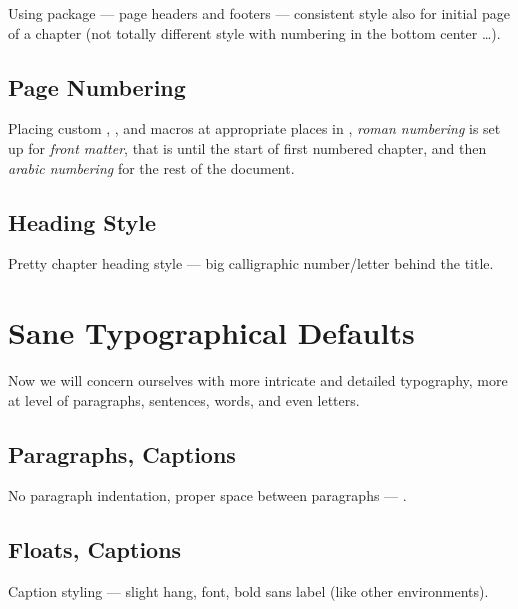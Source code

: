 Using  package --- page headers and footers --- consistent style also for initial page of a chapter (not totally different style with numbering in the bottom center \ldots).

\subsection{Page Numbering}%
\label{sub:Page Numbering}

Placing custom \custommacro{\frontmatter}, \custommacro{\mainmatter}, and \custommacro{\backmatter} macros at appropriate places in , \emph{roman numbering} is set up for \emph{front matter}, that is until the start of first numbered chapter, and then \emph{arabic numbering} for the rest of the document.


\subsection{Heading Style}%
\label{sub:Heading Style}

Pretty chapter heading style --- big calligraphic number/letter behind the title.


\section{Sane Typographical Defaults}%
\label{sec:Sane Typographical Defaults}

Now we will concern ourselves with more intricate and detailed typography, more at level of paragraphs, sentences, words, and even letters.

\subsection{Paragraphs, Captions}%
\label{sub:Paragraphs}

No paragraph indentation, proper space between paragraphs --- .

\subsection{Floats, Captions}%
\label{sub:Floats_Captions}

Caption styling --- slight hang, \macro{\footnotesize} font, bold sans label (like other environments).


